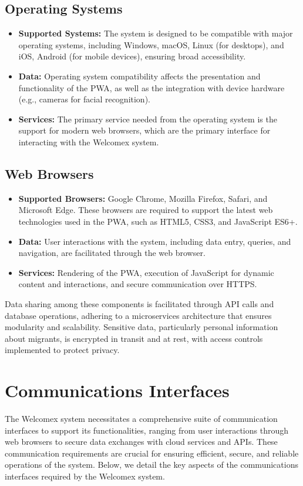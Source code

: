 \documentclass{scrreprt}
\begin{document}
\subsection*{Operating Systems}
\begin{itemize}
    \item \textbf{Supported Systems:} The system is designed to be compatible with major operating systems, including Windows, macOS, Linux (for desktops), and iOS, Android (for mobile devices), ensuring broad accessibility.
    \item \textbf{Data:} Operating system compatibility affects the presentation and functionality of the PWA, as well as the integration with device hardware (e.g., cameras for facial recognition).
    \item \textbf{Services:} The primary service needed from the operating system is the support for modern web browsers, which are the primary interface for interacting with the Welcomex system.
\end{itemize}

\subsection*{Web Browsers}
\begin{itemize}
    \item \textbf{Supported Browsers:} Google Chrome, Mozilla Firefox, Safari, and Microsoft Edge. These browsers are required to support the latest web technologies used in the PWA, such as HTML5, CSS3, and JavaScript ES6+.
    \item \textbf{Data:} User interactions with the system, including data entry, queries, and navigation, are facilitated through the web browser.
    \item \textbf{Services:} Rendering of the PWA, execution of JavaScript for dynamic content and interactions, and secure communication over HTTPS.
\end{itemize}
Data sharing among these components is facilitated through API calls and database operations, adhering to a microservices architecture that ensures modularity and scalability. Sensitive data, particularly personal information about migrants, is encrypted in transit and at rest, with access controls implemented to protect privacy.

\section{Communications Interfaces}
The Welcomex system necessitates a comprehensive suite of communication interfaces to support its functionalities, ranging from user interactions through web browsers to secure data exchanges with cloud services and APIs. These communication requirements are crucial for ensuring efficient, secure, and reliable operations of the system. Below, we detail the key aspects of the communications interfaces required by the Welcomex system.
\end{document}
